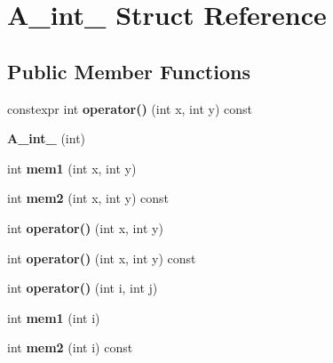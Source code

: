 \hypertarget{struct_a__int__2}{}\section{A\+\_\+int\+\_ Struct Reference}
\label{struct_a__int__2}
\subsection*{Public Member Functions}
\begin{DoxyCompactItemize}
\item 
\mbox{\label{struct_a__int__2_a90411837bb12a76cadb7dc1f4476ac6d}} 
constexpr int {\bfseries operator()} (int x, int y) const
\item 
\mbox{\label{struct_a__int__2_af2e15812666505544a018c7088ceaa73}} 
{\bfseries A\+\_\+int\+\_} (int)
\item 
\mbox{\label{struct_a__int__2_af074c8f7392398ef8b86bc8bc4af4d92}} 
int {\bfseries mem1} (int x, int y)
\item 
\mbox{\label{struct_a__int__2_ae2054ff53afdf458b8530e1b34828337}} 
int {\bfseries mem2} (int x, int y) const
\item 
\mbox{\label{struct_a__int__2_a399203d6a4a03954995e491cdf0bab86}} 
int {\bfseries operator()} (int x, int y)
\item 
\mbox{\label{struct_a__int__2_ade55939eb3dae0276cb240e991d755be}} 
int {\bfseries operator()} (int x, int y) const
\item 
\mbox{\label{struct_a__int__2_af01a93f443a99156796819fe71a454e5}} 
int {\bfseries operator()} (int i, int j)
\item 
\mbox{\label{struct_a__int__2_a6b47ab0ee30e4217c09b77e0f1c326f7}} 
int {\bfseries mem1} (int i)
\item 
\mbox{\label{struct_a__int__2_a414416c4ec4759d640643e953aba01a0}} 
int {\bfseries mem2} (int i) const
\item 
\mbox{\label{struct_a__int__2_af01a93f443a99156796819fe71a454e5}} 

\end{DoxyCompactItemize}
